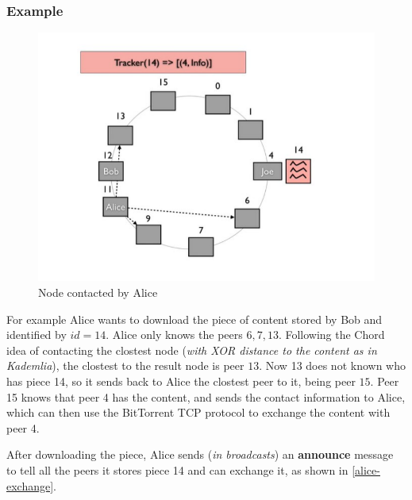\documentclass[10pt,a4paper]{report}
\begin{document}
\subsubsection{Example}\label{sec:example}
\begin{figure}[h]
	\centering
	\includegraphics[scale=0.60]{images/Pasted image 20230311111416.png}
	\caption{Node contacted by Alice}
\end{figure}

For example Alice wants to download the piece of content stored by Bob and identified by $id=14$. Alice only knows the peers $6,7,13$.
Following the Chord idea of contacting the clostest node (\textit{with XOR distance to the content as in Kademlia}), the clostest to the result node is peer $13$.
Now 13 does not known who has piece 14, so it sends back to Alice the clostest peer to it, being peer $15$.
Peer 15 knows that peer 4 has the content, and sends the contact information to Alice, which can then use the BitTorrent TCP protocol to exchange the content with peer 4.

After downloading the piece, Alice sends (\textit{in broadcasts}) an \textbf{announce} message to tell all the peers it stores piece 14 and can exchange it, as shown in \ref{alice-exchange}.
\end{document}
